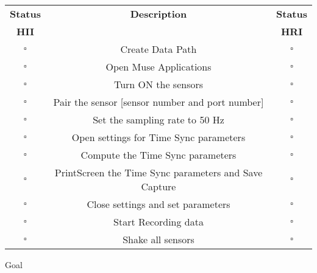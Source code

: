 \documentclass[a4paper]{article}
\begin{document}
\hspace{2cm}

\begin{tabular}{|c|c|c|}
\hline
\textbf{Status} & \textbf{Description} & \textbf{Status} \\
\textbf{HII} &  & \textbf{HRI} \\ \hline

$\square$ & Create Data Path & $\square$ \\ \hline
$\square$ & Open Muse Applications & $\square$ \\ \hline
$\square$ & Turn ON the sensors & $\square$  \\ \hline
$\square$ & Pair the sensor [sensor number and port number] & $\square$ \\ \hline

$\square$ & Set the sampling rate to 50 Hz  & $\square$ \\ \hline
$\square$ & Open settings for Time Sync parameters  & $\square$ \\ \hline
$\square$ & Compute the Time Sync parameters & $\square$ \\ \hline
$\square$ & PrintScreen the Time Sync parameters and Save Capture & $\square$ \\ \hline
$\square$ & Close settings and set parameters & $\square$ \\ \hline
$\square$ & Start Recording data & $\square$ \\ \hline
$\square$ & Shake all sensors & $\square$ \\ \hline

\end{tabular}





\begin{CheckList}{Goal}
\begin{minipage}[t]{0.5\textwidth}
\end{minipage}
\hspace{0.5cm}
\begin{minipage}[t]{0.5\textwidth}
\end{minipage}
\begin{minipage}[t]{0.5\textwidth}
\end{minipage}
\hspace{0.5cm}
\begin{minipage}[t]{0.5\textwidth}
\end{minipage}


\end{CheckList}
\end{document}
